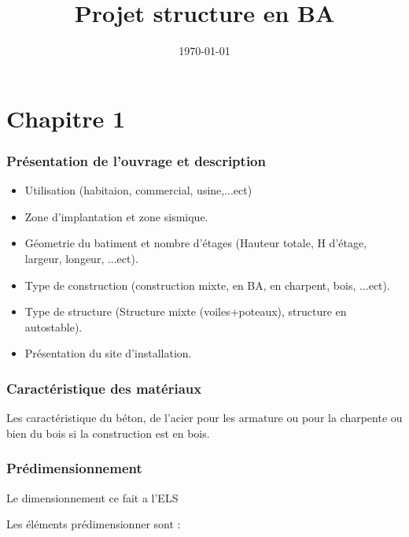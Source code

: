 \documentclass[12pt,a4paper]{article}
\title{Projet structure en BA}
\author{}
\date{\today}
\begin{document}
	
	
	\maketitle
	
	\tableofcontents
	
	\newpage
	
	
	\part{Chapitre 1}
	
	\section{Présentation de l'ouvrage et description}
	
	\begin{itemize}
		\item Utilisation (habitaion, commercial, usine,...ect)
		\item Zone d'implantation et zone sismique.
		\item Géometrie du batiment et nombre d'étages (Hauteur totale, H d'étage, largeur, longeur, ...ect).
		\item Type de construction (construction mixte, en BA, en charpent, bois, ...ect).
		\item Type de structure (Structure mixte (voiles+poteaux), structure en autostable).
		\item Présentation du site d'installation.
	\end{itemize}
	
	
	\section{Caractéristique des matériaux}
	
	Les caractéristique du béton, de l'acier pour les armature ou pour la charpente ou bien du bois si la construction est en bois.
	
	\section{Prédimensionnement}
	
	\begin{tcolorbox}[colback=gray!20, colframe=black, title=Remarque]
		Le dimensionnement ce fait a l'ELS
	\end{tcolorbox}
	
	Les éléments prédimensionner sont : 
	
\end{document}
